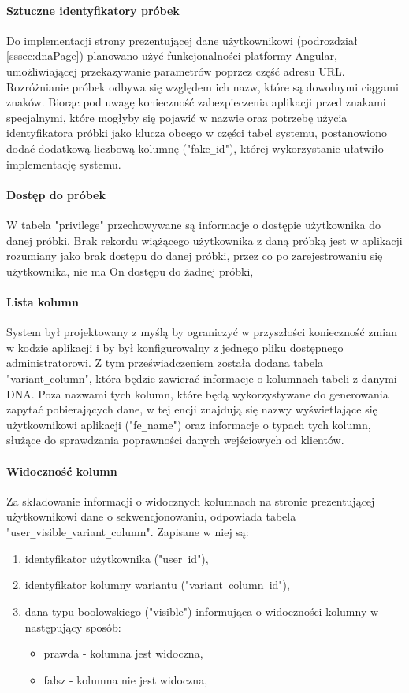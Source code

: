 \documentclass[a4paper,12pt,twoside]{article}
\begin{document}
\paragraph{Sztuczne identyfikatory próbek} Do implementacji strony
prezentującej dane użytkownikowi (podrozdział \ref{sssec:dnaPage}) planowano użyć 
funkcjonalności platformy Angular, umożliwiającej przekazywanie parametrów 
poprzez część adresu URL. Rozróżnianie próbek odbywa się względem ich nazw, które
są dowolnymi ciągami znaków. Biorąc pod uwagę konieczność zabezpieczenia aplikacji przed 
znakami specjalnymi, które mogłyby się pojawić w nazwie oraz potrzebę
użycia identyfikatora próbki jako klucza obcego w części tabel systemu, postanowiono
dodać dodatkową liczbową kolumnę ("fake\verb!_!id"), której wykorzystanie ułatwiło implementację systemu.

\paragraph{Dostęp do próbek} W tabela "privilege" przechowywane są informacje o 
dostępie użytkownika do danej próbki. Brak rekordu wiążącego użytkownika z 
daną próbką jest w aplikacji rozumiany jako brak dostępu do danej próbki,
przez co po zarejestrowaniu się użytkownika, nie ma On dostępu do żadnej próbki,

\paragraph{Lista kolumn} System był projektowany z myślą by ograniczyć w przyszłości konieczność zmian 
w kodzie aplikacji i by był konfigurowalny z jednego pliku dostępnego administratorowi.
Z tym przeświadczeniem została dodana tabela "variant\verb!_!column", która będzie zawierać
informacje o kolumnach tabeli z danymi DNA. Poza nazwami tych kolumn, które będą 
wykorzystywane do generowania zapytać pobierających dane, w tej encji znajdują
się nazwy wyświetlające się użytkownikowi aplikacji ("fe\verb!_!name") oraz informacje o typach
tych kolumn, służące do sprawdzania poprawności danych wejściowych od klientów.

\paragraph{Widoczność kolumn} Za składowanie informacji o widocznych kolumnach na
stronie prezentującej użytkownikowi dane o sekwencjonowaniu, odpowiada tabela 
"user\verb!_!visible\verb!_!variant\verb!_!column". Zapisane w niej są:
\begin{enumerate}[1)]
\item identyfikator użytkownika ("user\verb!_!id"),
\item identyfikator kolumny wariantu ("variant\verb!_!column\verb!_!id"),
\item dana typu boolowskiego ("visible") informująca o widoczności kolumny w następujący sposób:
\begin{itemize}
\item prawda - kolumna jest widoczna,
\item fałsz - kolumna nie jest widoczna,
\end{itemize}
\end{enumerate} 
\end{document}
